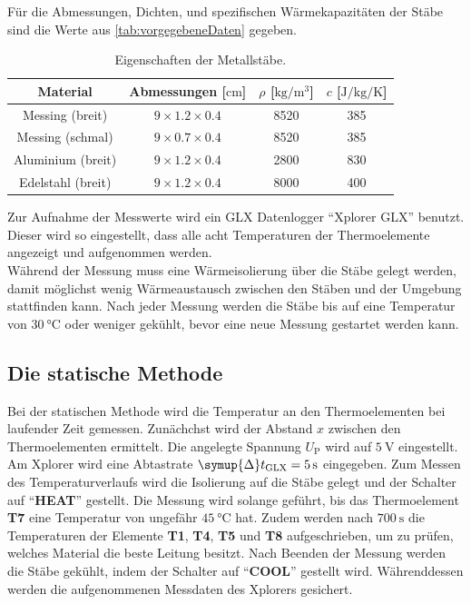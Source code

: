     Für die Abmessungen, Dichten, und spezifischen Wärmekapazitäten der Stäbe sind die Werte aus \autoref{tab:vorgegebeneDaten} gegeben.
    \begin{table}
        \centering
        \caption{Eigenschaften der Metallstäbe.}
        \label{tab:vorgegebeneDaten}
        \begin{tabular}{c c c c}
            \toprule
            Material &
            Abmessungen [$\si{\centi\meter}$] &
            $\rho$ [$\si{\kilo\gram\per\cubic\meter}$] &
            $c$ [$\si{\joule\per\kilo\gram\per\kelvin}$] \\
            \midrule
            Messing (breit)   & $9 \times 1.2 \times 0.4$ & 8520 & 385 \\
            Messing (schmal)  & $9 \times 0.7 \times 0.4$ & 8520 & 385 \\
            Aluminium (breit) & $9 \times 1.2 \times 0.4$ & 2800 & 830 \\
            Edelstahl (breit) & $9 \times 1.2 \times 0.4$ & 8000 & 400 \\
            \bottomrule
        \end{tabular}
    \end{table}

    Zur Aufnahme der Messwerte wird ein GLX Datenlogger \enquote{Xplorer GLX} benutzt.
    Dieser wird so eingestellt, dass alle acht Temperaturen der Thermoelemente angezeigt und aufgenommen werden.
    \\
    Während der Messung muss eine Wärmeisolierung über die Stäbe gelegt werden,
    damit möglichst wenig Wärmeaustausch zwischen den Stäben und der Umgebung stattfinden kann.
    Nach jeder Messung werden die Stäbe bis auf eine Temperatur von $\SI{30}{\celsius}$ oder
    weniger gekühlt, bevor eine neue Messung gestartet werden kann.

\subsection{Die statische Methode}

    Bei der statischen Methode wird die Temperatur an den Thermoelementen bei
    laufender Zeit gemessen.
    Zunächchst wird der Abstand $x$ zwischen den Thermoelementen ermittelt.
    Die angelegte Spannung $U_\text{P}$ wird auf $\SI{5}{\volt}$ eingestellt.
    Am Xplorer wird eine Abtastrate $\symup{\Delta} t_\text{GLX} = \SI{5}{\second}$ eingegeben.
    Zum Messen des Temperaturverlaufs wird die Isolierung auf die Stäbe gelegt
    und der Schalter auf \enquote{\textbf{HEAT}} gestellt.
    Die Messung wird solange geführt,
    bis das Thermoelement \textbf{T7} eine Temperatur von ungefähr $\SI{45}{\celsius}$ hat.
    Zudem werden nach $\SI{700}{\second}$ die Temperaturen der Elemente \textbf{T1}, \textbf{T4}, \textbf{T5} und \textbf{T8} aufgeschrieben,
    um zu prüfen, welches Material die beste Leitung besitzt.
    Nach Beenden der Messung werden die Stäbe gekühlt,
    indem der Schalter auf \enquote{\textbf{COOL}} gestellt wird.
    Währenddessen werden die aufgenommenen Messdaten des Xplorers gesichert.

